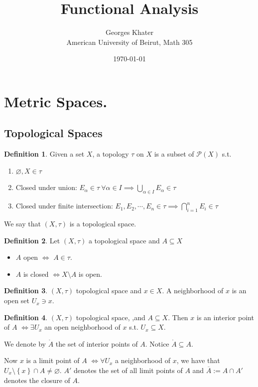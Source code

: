 \documentclass[11pt,a4paper]{article}
\title{\LARGE\bfseries Functional Analysis}
\author{Georges Khater \\ \small American University of Beirut, Math 305}
\date{\today}
\theoremstyle{definition}
\newtheorem{definition}{Definition}[section]
\theoremstyle{plain}
\theoremstyle{remark}
\renewcommand{\set}[1]{\left\{ #1 \right\}}
\newcommand{\1}{\mathbbm{1}}
\begin{document}
\maketitle
\tableofcontents
\bigskip

\section{Metric Spaces.} 

\subsection{Topological Spaces}

\begin{definition}
    Given a set $X$, a topology $\tau$ on $X$ is a subset of $\mathcal{P}(X)$ s.t. 
    \begin{enumerate}
        \item $\varnothing, X \in \tau$
        \item Closed under union: $E_\alpha \in \tau \ \forall \alpha \in I \implies \bigcup_{\alpha \in I} E_\alpha \in \tau$
        \item Closed under finite intersection: $E_1, E_2, \cdots, E_n \in \tau \implies \bigcap_{i=1}^n E_i \in \tau$
    \end{enumerate}
    We say that $(X, \tau)$ is a topological space.
\end{definition}

\begin{definition}
    Let $(X, \tau)$ a topological space and $A \subseteq X$
    \begin{itemize}
        \item $A$ open $\iff$ $A \in \tau$. 
        \item $A$ is closed $\iff X \setminus A$ is open.
    \end{itemize}
\end{definition}

\begin{definition}
    $(X, \tau)$ topological space and $x \in X$. A neighborhood of $x$ is an open set $U_x \ni x$. 
\end{definition}

\begin{definition}
    $(X, \tau)$ topological space, ,and $A \subseteq X$. Then $x$ is an interior point of $A$ $\iff \exists U_x$ an open neighborhood of $x$ s.t. 
    $U_x \subseteq X$. 

    We denote by $\mathring{A}$ the set of interior points of $A$. Notice $\mathring{A} \subseteq A$.

    Now $x$ is a limit point of $A$ $\iff \forall U_x$ a neighborhood of $x$, we have that $U_x \setminus \set{x} \cap A \ne \varnothing$. $A'$ denotes the set of all 
    limit points of $A$ and $\overline{A} := A \cap A'$ denotes the closure of $A$.
\end{definition}
\end{document}
